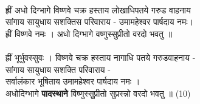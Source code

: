 \\
{\small ह्रीं अधो दिग्भागे विष्णवे चक्र हस्ताय लोखाधिपतये गरुड वाहनाय\\
सांगाय सायुधाय सशक्तिस परिवाराय -  उमामहेश्वर पार्षदाय नमः।\\
ह्रीं विष्णवे नमः । अधो दिग्भागे वष्णुस्सुप्रीतो वरदो भवतु ॥}\\
\\
ह्रीं भूर्भुवस्सुवः । विष्णवे चक्र हस्ताय नागाधि पतये गरुडवाहनाय -\\
सांगाय सायुधाय सशक्ति परिवाराय -\\
सर्वालंकार भूषिताय उमामहेश्वर पार्षदाय नमः ।\\
अधोदिग्भागे \textbf{पादस्थाने} विष्णुस्सुुप्रीतो सुप्रस्न्नो वरदो भवतु ॥  (10)\\

